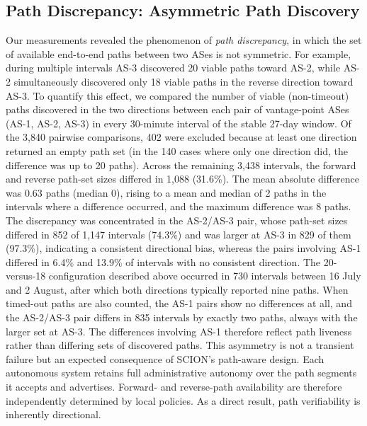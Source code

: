 \documentclass[pdflatex,sn-vancouver-num]{sn-jnl}%
\theoremstyle{thmstyleone}%
\theoremstyle{thmstyletwo}%
\theoremstyle{thmstylethree}%
\begin{document}
\subsection{Path Discrepancy: Asymmetric Path Discovery}
Our measurements revealed the phenomenon of \textit{path discrepancy}, in which the set of available end-to-end paths between two ASes is not symmetric. For example, during multiple intervals AS-3 discovered 20 viable paths toward AS-2, while AS-2 simultaneously discovered only 18 viable paths in the reverse direction toward AS-3.
To quantify this effect, we compared the number of viable (non-timeout) paths discovered in the two directions between each pair of vantage-point ASes (AS-1, AS-2, AS-3) in every 30-minute interval of the stable 27-day window. Of the 3{,}840 pairwise comparisons, 402 were excluded because at least one direction returned an empty path set (in the 140 cases where only one direction did, the difference was up to 20 paths).
Across the remaining 3{,}438 intervals, the forward and reverse path-set sizes differed in 1{,}088 (31.6\%). The mean absolute difference was 0.63 paths (median 0), rising to a mean and median of 2 paths in the intervals where a difference occurred, and the maximum difference was 8 paths.
The discrepancy was concentrated in the AS-2/AS-3 pair, whose path-set sizes differed in 852 of 1{,}147 intervals (74.3\%) and was larger at AS-3 in 829 of them (97.3\%), indicating a consistent directional bias, whereas the pairs involving AS-1 differed in 6.4\% and 13.9\% of intervals with no consistent direction.
The 20-versus-18 configuration described above occurred in 730 intervals between 16 July and 2 August, after which both directions typically reported nine paths.
When timed-out paths are also counted, the AS-1 pairs show no differences at all, and the AS-2/AS-3 pair differs in 835 intervals by exactly two paths, always with the larger set at AS-3. The differences involving AS-1 therefore reflect path liveness rather than differing sets of discovered paths.
% 
This asymmetry is not a transient failure but an expected consequence of SCION's path-aware design. Each autonomous system retains full administrative autonomy over the path segments it accepts and advertises. Forward- and reverse-path availability are therefore independently determined by local policies. As a direct result, path verifiability is inherently directional.
\end{document}
